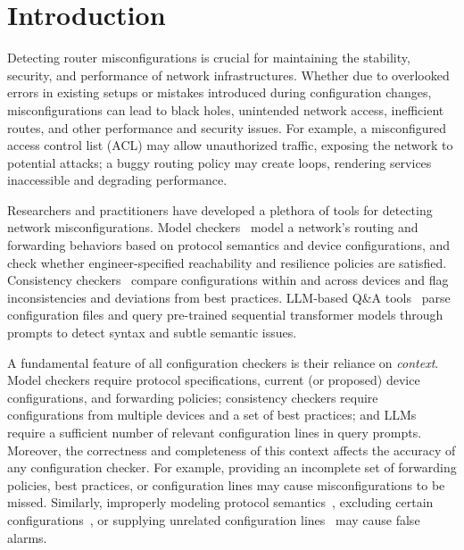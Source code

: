 
\section{Introduction}
\label{sec:intro}

Detecting router misconfigurations is crucial for maintaining the stability,
security, and performance of network infrastructures. Whether due to
overlooked errors in existing setups or mistakes introduced during
configuration changes, misconfigurations can lead to black holes, unintended
network access, inefficient routes, and other performance and security
issues.  For example, a misconfigured access control list (ACL) may allow
unauthorized traffic, exposing the network to potential attacks; a buggy
routing policy may create loops, rendering services inaccessible and degrading
performance.

Researchers and practitioners have developed a plethora of tools for detecting
network misconfigurations. Model checkers~\cite{fogel2015general,
beckett2017general, abhashkumar2020tiramisu, prabhu2020plankton, zhang2022sre,
steffen2020netdice, ye2020hoyan, ritchey2000using,al2011configchecker,
jeffrey2009model} model a network's routing and forwarding behaviors based on
protocol semantics and device configurations, and check whether
engineer-specified reachability and resilience policies are satisfied.
Consistency checkers~\cite{kakarla2024diffy, kakarla2020finding,
le2006minerals, feamster2005detecting,
tang2021campion,le2008detecting,le2006characterization} compare configurations
within and across devices and flag inconsistencies and deviations from best
practices. LLM-based Q\&A
tools~\cite{bogdanov2024leveraging,chen2024automatic,wang2024identifying,liu2024large,
wang2024netconfeval, lian2023configuration} parse configuration files and
query pre-trained sequential transformer models through prompts to detect syntax and subtle
semantic issues.

A fundamental feature of all configuration checkers is their reliance on {\em
context}. Model checkers require protocol specifications, current (or
proposed) device configurations, and forwarding policies; consistency checkers
require configurations from multiple devices and a set of best practices; and
LLMs require a sufficient number of relevant configuration lines in query
prompts. Moreover, the correctness and completeness of this context affects 
the accuracy of any configuration checker. For example, providing an incomplete set of
forwarding policies, best practices, or configuration lines
may cause misconfigurations to be missed. Similarly, improperly modeling
protocol semantics~\cite{birkner2021metha, ye2020hoyan}, excluding certain
configurations~\cite{xu2023netcov}, or supplying unrelated configuration
lines~\cite{liskavets2024prompt,tian2024examining,khurana2024and,
shvartzshnaider2024llm} may cause false alarms.

